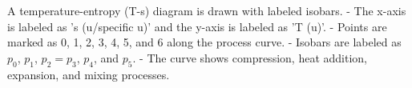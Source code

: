 A temperature-entropy (T-s) diagram is drawn with labeled isobars.  
- The x-axis is labeled as 's (u/specific u)' and the y-axis is labeled as 'T (u)'.  
- Points are marked as 0, 1, 2, 3, 4, 5, and 6 along the process curve.  
- Isobars are labeled as \( p_0 \), \( p_1 \), \( p_2 = p_3 \), \( p_4 \), and \( p_5 \).  
- The curve shows compression, heat addition, expansion, and mixing processes.